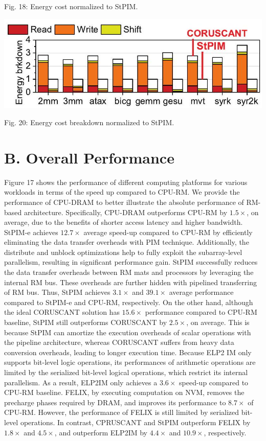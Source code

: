 \documentclass[10pt]{article}
\begin{document}
Fig. 18: Energy cost normalized to StPIM.

\begin{center}
\includegraphics[max width=\textwidth]{2024_05_12_abeba8a85da5b5ec4c7bg-10(2)}
\end{center}

Fig. 20: Energy cost breakdown normalized to StPIM.

\section*{B. Overall Performance}
Figure 17 shows the performance of different computing platforms for various workloads in terms of the speed up compared to CPU-RM. We provide the performance of CPU-DRAM to better illustrate the absolute performance of RM-based architecture. Specifically, CPU-DRAM outperforms CPU-RM by $1.5 \times$, on average, due to the benefits of shorter access latency and higher bandwidth. StPIM-e achieves $12.7 \times$ average speed-up compared to CPU-RM by efficiently eliminating the data transfer overheads with PIM technique. Additionally, the distribute and unblock optimizations help to fully exploit the subarray-level parallelism, resulting in significant performance gain. StPIM successfully reduces the data transfer overheads between RM mats and processors by leveraging the internal RM bus. These overheads are further hidden with pipelined transferring of RM bus. Thus, StPIM achieves $3.1 \times$ and $39.1 \times$ average performance compared to StPIM-e and CPU-RM, respectively. On the other hand, although the ideal CORUSCANT solution has $15.6 \times$ performance compared to CPU-RM baseline, StPIM still outperforms CORUSCANT by $2.5 \times$, on average. This is because StPIM can amortize the execution overheads of scalar operations with the pipeline architecture, whereas CORUSCANT suffers from heavy data conversion overheads, leading to longer execution time. Because ELP2 IM only supports bit-level logic operations, its performances of arithmetic operations are limited by the serialized bit-level logical operations, which restrict its internal parallelism. As a result, ELP2IM only achieves a $3.6 \times$ speed-up compared to CPU-RM baseline. FELIX, by executing computation on NVM, removes the precharge phases required by DRAM, and improves its performance to $8.7 \times$ of CPU-RM. However, the performance of FELIX is still limited by serialized bit-level operations. In contrast, CPRUSCANT and StPIM outperform FELIX by $1.8 \times$ and $4.5 \times$, and outperform ELP2IM by $4.4 \times$ and $10.9 \times$, respectively.
\end{document}
